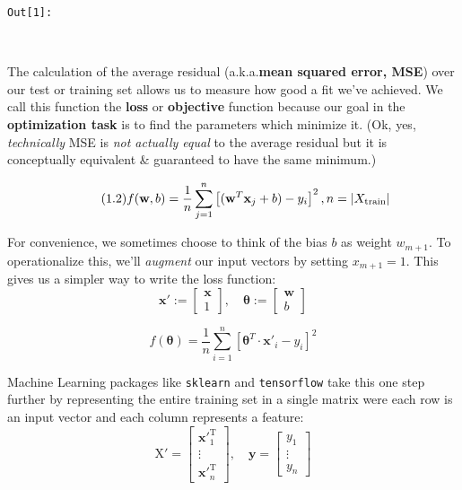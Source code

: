 \documentclass[11pt]{article}
\begin{document}
\texttt{\color{outcolor}Out[{\color{outcolor}1}]:}
    
    \begin{center}
    \end{center}
    { \hspace*{\fill} \\}
    

    The calculation of the average residual (a.k.a.\textbf{mean squared
error, MSE}) over our test or training set allows us to measure how good
a fit we've achieved. We call this function the \textbf{loss} or
\textbf{objective} function because our goal in the \textbf{optimization
task} is to find the parameters which minimize it. (Ok, yes,
\emph{technically} MSE is \emph{not actually equal} to the average
residual but it is conceptually equivalent \& guaranteed to have the
same minimum.)

\begin{equation}\tag{1.2}
f(\mathbf{w}, b) = \frac{1}{n}\sum_{j=1}^{n}\left[ (\mathbf{w}^T\mathbf{x}_j + b) - y_i\right]^2,\\
n = \left|X_{\text{train}}\right|
\end{equation}

For convenience, we sometimes choose to think of the bias \(b\) as
weight \(w_{m+1}\). To operationalize this, we'll \emph{augment} our
input vectors by setting \(x_{m+1}=1\). This gives us a simpler way to
write the loss function: \[
\mathbf{x}' :=
\begin{bmatrix}
\mathbf{x}\\
1
\end{bmatrix},\quad
\boldsymbol{\theta} :=
\begin{bmatrix}
\mathbf{w}\\
b
\end{bmatrix}
\]

\begin{equation}\tag{1.3}
f(\boldsymbol{\theta}) = \frac{1}{n}\sum_{i=1}^{n}\left[ \boldsymbol{\theta}^T\cdot\mathbf{x}'_i - y_i\right]^2
\end{equation}

Machine Learning packages like \texttt{sklearn} and \texttt{tensorflow}
take this one step further by representing the entire training set in a
single matrix were each row is an input vector and each column
represents a feature: \[
\text{X}' =
\begin{bmatrix}
\mathbf{x'}_1^{\text{T}}\\
\vdots\\
\mathbf{x'}_n^{\text{T}}
\end{bmatrix},\quad
\mathbf{y} = 
\begin{bmatrix}
y_1\\
\vdots\\
y_n
\end{bmatrix}
\]
\end{document}
